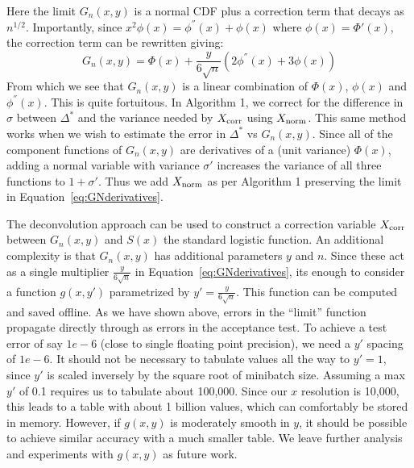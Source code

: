 \documentclass{article}
\begin{document}
Here the limit $G_n(x,y)$ is a normal CDF plus a correction term that decays as
$n^{1/2}$. Importantly, since $x^2\phi(x) = \phi^{''}(x) + \phi(x)$ where
$\phi(x)=\Phi'(x)$, the correction term can be rewritten giving:
\begin{equation}\label{eq:GNderivatives}
    G_n(x,y) = \Phi(x) + \frac{y}{6\sqrt{n}}(2\phi^{''}(x)+3\phi(x))
\end{equation}
From which we see that $G_n(x,y)$ is a linear combination of $\Phi(x)$,
$\phi(x)$ and $\phi^{''}(x)$. This is quite fortuitous. In Algorithm 1, we
correct for the difference in $\sigma$ between $\Delta^*$ and the variance
needed by $X_{\rm corr}$ using $X_{\rm norm}$. This same method works when we
wish to estimate the error in $\Delta^*$ vs $G_n(x,y)$. Since all of the
component functions of $G_n(x,y)$ are derivatives of a (unit variance)
$\Phi(x)$, adding a normal variable with variance $\sigma'$ increases the
variance of all three functions to $1+\sigma'$. Thus we add $X_{\rm norm}$ as
per Algorithm 1 preserving the limit in Equation~\ref{eq:GNderivatives}.

The deconvolution approach can be used to construct a correction variable
$X_{\rm corr}$ between $G_n(x,y)$ and $S(x)$ the standard logistic function. An
additional complexity is that $G_n(x,y)$ has additional parameters $y$ and $n$.
Since these act as a single multiplier $\frac{y}{6\sqrt{n}}$ in
Equation~\ref{eq:GNderivatives}, its enough to consider a function $g(x,y')$
parametrized by $y'= \frac{y}{6\sqrt{n}}$. This function can be computed and
saved offline. As we have shown above, errors in the ``limit'' function
propagate directly through as errors in the acceptance test.  To achieve a test
error of say $1e-6$ (close to single floating point precision), we need a $y'$
spacing of $1e-6$. It should not be necessary to tabulate values all the way to
$y'=1$, since $y'$ is scaled inversely by the square root of minibatch size.
Assuming a max $y'$ of 0.1 requires us to tabulate about 100,000.  Since our $x$
resolution is 10,000, this leads to a table with about 1 billion values, which
can comfortably be stored in memory.  However, if $g(x,y)$ is moderately smooth
in $y$, it should be possible to achieve similar accuracy with a much smaller
table. We leave further analysis and experiments with $g(x,y)$ as future work. 
\end{document}
